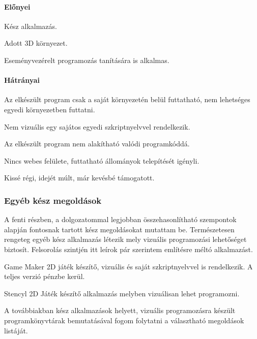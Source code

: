\documentclass[12pt,a4paper,oneside]{report} %
\begin{document}
\paragraph{Előnyei} 
\begin{compactitem}
	\item Kész alkalmazás.
	\item Adott 3D környezet.
	\item Eseményvezérelt programozás tanítására is alkalmas.
\end{compactitem}
\paragraph{Hátrányai} 
\begin{compactitem}
	\item Az elkészült program csak a saját környezetén belül futtatható, nem lehetséges egyedi környezetben futtatni.
	\item Nem vizuális egy sajátos egyedi szkriptnyelvvel rendelkezik.
	\item Az elkészült program nem alakítható valódi programkóddá.
	\item Nincs webes felülete, futtatható állományok telepítését igényli.
	\item Kissé régi, idejét múlt, már kevésbé támogatott.
\end{compactitem}
\subsubsection{Egyéb kész megoldások}
A fenti részben, a dolgozatommal legjobban összehasonlítható szempontok alapján fontosnak tartott kész megoldásokat mutattam be. Természetesen rengeteg egyéb kész alkalmazás létezik mely vizuális programozási lehetőséget biztosít. Felsorolás szintjén itt leírok pár szerintem említésre méltó alkalmazást. 
\begin{compactitem}
	\item Game Maker \cite{jenson2016exploring} 2D játék készítő, vizuális és saját szkriptnyelvvel is rendelkezik. A teljes verzió pénzbe kerül.
	\item Stencyl \cite{liu2014making} 2D Játék készítő alkalmazás melyben vizuálisan lehet programozni.
\end{compactitem}
A továbbiakban kész alkalmazások helyett, vizuális programozásra készült programkönyvtárak bemutatásával fogom folytatni a választható megoldások listáját.  
\end{document}
